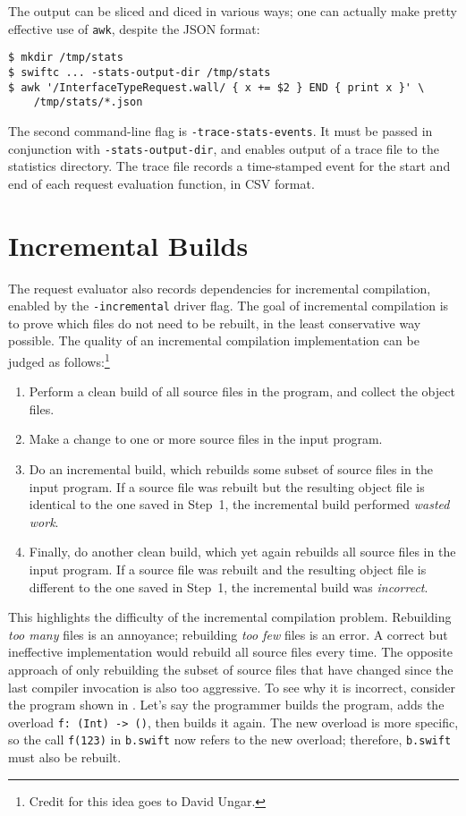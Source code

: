 \documentclass[../generics]{subfiles}
\begin{document}
The output can be sliced and diced in various ways; one can actually make pretty effective use of \texttt{awk}, despite the JSON format:
\begin{Verbatim}
$ mkdir /tmp/stats
$ swiftc ... -stats-output-dir /tmp/stats
$ awk '/InterfaceTypeRequest.wall/ { x += $2 } END { print x }' \
    /tmp/stats/*.json
\end{Verbatim}
The second command-line flag is \texttt{-trace-stats-events}. It must be passed in conjunction with \texttt{-stats-output-dir}, and enables output of a trace file to the statistics directory. The trace file records a time-stamped event for the start and end of each request evaluation function, in CSV format.
\IndexFlag{stats-output-dir}

\section{Incremental Builds}\label{incremental builds}
The request evaluator also records dependencies for incremental compilation, enabled by the \verb|-incremental| driver flag. The goal of incremental compilation is to prove which files do not need to be rebuilt, in the least conservative way possible. The quality of an incremental compilation implementation can be judged as follows:\footnote{Credit for this idea goes to David Ungar.}
\begin{enumerate}
\item Perform a clean build of all source files in the program, and collect the object files.
\item Make a change to one or more source files in the input program.
\item Do an incremental build, which rebuilds some subset of source files in the input program. If a source file was rebuilt but the resulting object file is identical to the one saved in Step~1, the incremental build performed \emph{wasted work}.
\item Finally, do another clean build, which yet again rebuilds all source files in the input program. If a source file was rebuilt and the resulting object file is different to the one saved in Step~1, the incremental build was \emph{incorrect}.
\end{enumerate}
This highlights the difficulty of the incremental compilation problem. Rebuilding \emph{too many} files is an annoyance; rebuilding \emph{too few} files is an error. A correct but ineffective implementation would rebuild all source files every time. The opposite approach of only rebuilding the subset of source files that have changed since the last compiler invocation is also too aggressive. To see why it is incorrect, consider the program shown in . Let's say the programmer builds the program, adds the overload \verb|f: (Int) -> ()|, then builds it again. The new overload is more specific, so the call \texttt{f(123)} in \texttt{b.swift} now refers to the new overload; therefore, \texttt{b.swift} must also be rebuilt.
\end{document}
